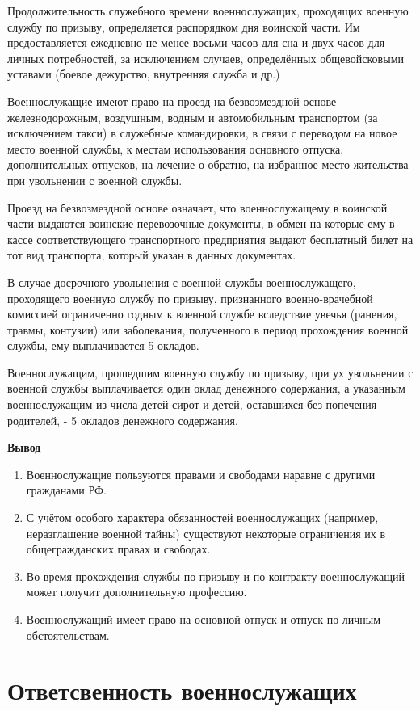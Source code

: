 \documentclass[12pt,a4paper]{report}
\begin{document}
Продолжительность служебного времени военнослужащих, проходящих военную службу по призыву, определяется распорядком дня воинской части.
Им предоставляется ежедневно не менее восьми часов для сна и двух часов для личных потребностей, за исключением случаев, определённых общевойсковыми уставами (боевое дежурство, внутренняя служба и др.)

Военнослужащие имеют право на проезд на безвозмездной основе железнодорожным, воздушным, водным и автомобильным транспортом (за исключением такси) в служебные командировки, в связи с переводом на новое место военной службы, к местам использования основного отпуска, дополнительных отпусков, на лечение о обратно, на избранное место жительства при увольнении с военной службы.

Проезд на безвозмездной основе означает, что военнослужащему в воинской части выдаются воинские перевозочные документы, в обмен на которые ему в кассе соответствующего транспортного предприятия выдают бесплатный билет на тот вид транспорта, который указан в данных документах.

В случае досрочного увольнения с военной службы военнослужащего, проходящего военную службу по призыву, признанного военно-врачебной комиссией ограниченно годным к военной службе вследствие увечья (ранения, травмы, контузии) или заболевания, полученного в период прохождения военной службы, ему выплачивается 5 окладов.

Военнослужащим, прошедшим военную службу по призыву, при ух увольнении с военной службы выплачивается один оклад денежного содержания, а указанным военнослужащим из числа детей-сирот и детей, оставшихся без попечения родителей, - 5 окладов денежного содержания.

\textbf{Вывод}
\begin{enumerate}
\item Военнослужащие пользуются правами и свободами наравне с другими гражданами РФ.
\item С учётом особого характера обязанностей военнослужащих (например, неразглашение военной тайны) существуют некоторые ограничения их в общегражданских правах и свободах.
\item Во время прохождения службы по призыву и по контракту военнослужащий может получит дополнительную профессию.
\item Военнослужащий имеет право на основной отпуск и отпуск по личным обстоятельствам.
\end{enumerate}

\section{Ответсвенность военнослужащих}
\end{document}
